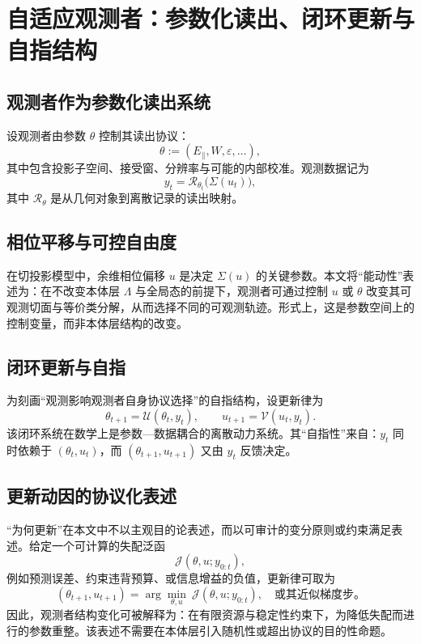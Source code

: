 \section{自适应观测者：参数化读出、闭环更新与自指结构}

\subsection{观测者作为参数化读出系统}

设观测者由参数 $\theta$ 控制其读出协议：
\[
\theta := (E_{\parallel},W,\varepsilon,\ldots),
\]
其中包含投影子空间、接受窗、分辨率与可能的内部校准。观测数据记为
\[
y_t = \mathcal{R}_{\theta_t}\big(\Sigma(u_t)\big),
\]
其中 $\mathcal{R}_{\theta}$ 是从几何对象到离散记录的读出映射。

\subsection{相位平移与可控自由度}

在切投影模型中，余维相位偏移 $u$ 是决定 $\Sigma(u)$ 的关键参数。本文将“能动性”表述为：在不改变本体层 $\Lambda$ 与全局态的前提下，观测者可通过控制 $u$ 或 $\theta$ 改变其可观测切面与等价类分解，从而选择不同的可观测轨迹。形式上，这是参数空间上的控制变量，而非本体层结构的改变。

\subsection{闭环更新与自指}

为刻画“观测影响观测者自身协议选择”的自指结构，设更新律为
\[
\theta_{t+1} = \mathcal{U}(\theta_t, y_t),
\qquad
u_{t+1} = \mathcal{V}(u_t, y_t).
\]
该闭环系统在数学上是参数—数据耦合的离散动力系统。其“自指性”来自：$y_t$ 同时依赖于 $(\theta_t,u_t)$，而 $(\theta_{t+1},u_{t+1})$ 又由 $y_t$ 反馈决定。

\subsection{更新动因的协议化表述}

“为何更新”在本文中不以主观目的论表述，而以可审计的变分原则或约束满足表述。给定一个可计算的失配泛函
\[
\mathcal{J}(\theta,u; y_{0:t}) ,
\]
例如预测误差、约束违背预算、或信息增益的负值，更新律可取为
\[
(\theta_{t+1},u_{t+1})
=
\arg\min_{\theta,u}\ \mathcal{J}(\theta,u; y_{0:t}),
\quad \text{或其近似梯度步。}
\]
因此，观测者结构变化可被解释为：在有限资源与稳定性约束下，为降低失配而进行的参数重整。该表述不需要在本体层引入随机性或超出协议的目的性命题。

